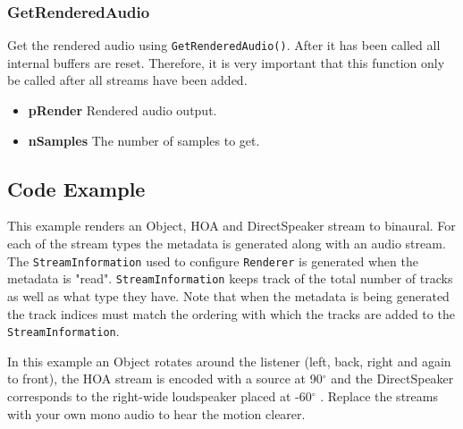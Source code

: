 \documentclass[12pt]{report}
\def\deg{$^{\circ}$ }
\newcommand{\code}[1]{\texttt{#1}}
\begin{document}
\subsubsection{GetRenderedAudio}

Get the rendered audio using \code{GetRenderedAudio()}.
After it has been called all internal buffers are reset.
Therefore, it is very important that this function only be called after all streams have been added.
\begin{itemize}
    \item \textbf{pRender} Rendered audio output.
    \item \textbf{nSamples} The number of samples to get.
\end{itemize}

\subsection{Code Example}\label{AdmFullCodeExample}

This example renders an Object, HOA and DirectSpeaker stream to binaural.
For each of the stream types the metadata is generated along with an audio stream.
The \code{StreamInformation} used to configure \code{Renderer} is generated when the metadata is "read".
\code{StreamInformation} keeps track of the total number of tracks as well as what type they have.
Note that when the metadata is being generated the track indices must match the ordering with which the tracks are added to the \code{StreamInformation}.

In this example an Object rotates around the listener (left, back, right and again to front), the HOA stream is encoded with a source at 90\deg and the DirectSpeaker corresponds to the right-wide loudspeaker placed at -60\deg. Replace the streams with your own mono audio to hear the motion clearer.
\end{document}
